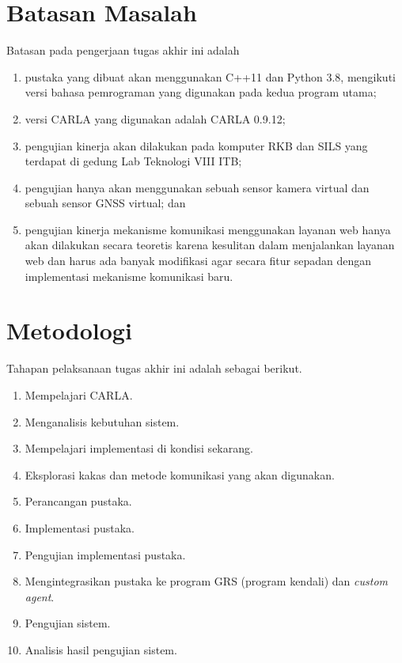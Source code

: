 \section{Batasan Masalah}

Batasan pada pengerjaan tugas akhir ini adalah

\begin{enumerate}
	\item pustaka yang dibuat akan menggunakan C++11 dan Python 3.8, mengikuti
	      versi bahasa pemrograman yang digunakan pada kedua program utama;
	\item versi CARLA yang digunakan adalah CARLA 0.9.12;
	\item pengujian kinerja akan dilakukan pada komputer RKB dan SILS yang
	      terdapat di gedung Lab Teknologi VIII ITB;
	\item pengujian hanya akan menggunakan sebuah sensor kamera virtual dan
	      sebuah sensor GNSS virtual; dan
	\item pengujian kinerja mekanisme komunikasi menggunakan layanan web hanya akan
	      dilakukan secara teoretis karena kesulitan dalam menjalankan layanan web
	      dan harus ada banyak modifikasi agar secara fitur sepadan dengan
	      implementasi mekanisme komunikasi baru.
\end{enumerate}

\section{Metodologi}


Tahapan pelaksanaan tugas akhir ini adalah sebagai berikut.

\begin{enumerate}
	\item Mempelajari CARLA.
	\item Menganalisis kebutuhan sistem.
	\item Mempelajari implementasi di kondisi sekarang.
	\item Eksplorasi kakas dan metode komunikasi yang akan digunakan.
	\item Perancangan pustaka.
	\item Implementasi pustaka.
	\item Pengujian implementasi pustaka.
	\item Mengintegrasikan pustaka ke program GRS (program kendali) dan
	      \textit{custom agent}.
	\item Pengujian sistem.
	\item Analisis hasil pengujian sistem.
\end{enumerate}

